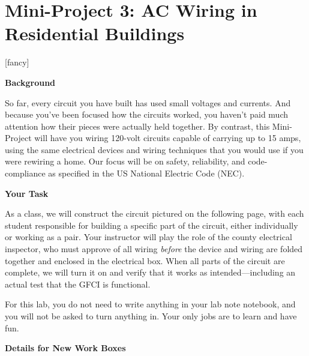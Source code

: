 \section*{Mini-Project 3: AC Wiring in Residential Buildings}
\label{lab_building_wiring}

[fancy]{%
	\fancyhead[LO,RE]{}
}
\pagestyle{interlude}


\bigskip

\textbf{Background}

So far, every circuit you have built has used small voltages and currents.  And because you've been focused how the circuits worked, you haven't paid much attention how their pieces were actually held together.  By contrast, this Mini-Project will have you wiring 120-volt circuits capable of carrying up to 15 amps, using the same electrical devices and wiring techniques that you would use if you were rewiring a home.  Our focus will be on safety, reliability, and code-compliance as specified in the US National Electric Code (NEC).

\bigskip
\textbf{Your Task}

As a class, we will construct the circuit pictured on the following page, with each student responsible for building a specific part of the circuit, either individually or working as a pair.  Your instructor will play the role of the county electrical inspector, who must approve of all wiring \textit{before} the device and wiring are folded together and enclosed in the electrical box.  When all parts of the circuit are complete, we will turn it on and verify that it works as intended---including an actual test that the GFCI is functional.

For this lab, you do not need to write anything in your lab note notebook, and you will not be asked to turn anything in.  Your only jobs are to learn and have fun.


\bigskip
\textbf{Details for New Work Boxes}

